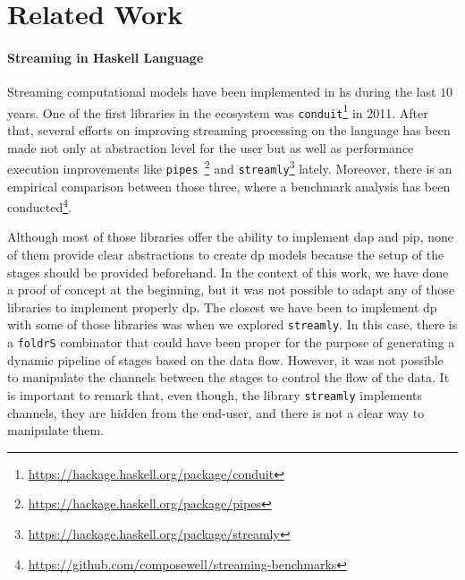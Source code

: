 \section{Related Work}\label{section:related-work}

\paragraph{Streaming in Haskell Language}
Streaming computational models have been implemented in \acrlong{hs} during the last $10$ years. One of the first libraries in the ecosystem was \texttt{conduit}\footnote{\url{https://hackage.haskell.org/package/conduit}} in 2011.
After that, several efforts on improving streaming processing on the language has been made not only at abstraction level for the user but as well as performance execution 
improvements like \texttt{pipes}~\footnote{\url{https://hackage.haskell.org/package/pipes}} and \texttt{streamly}\footnote{\url{https://hackage.haskell.org/package/streamly}} lately.
Moreover, there is an empirical comparison between those three, where a benchmark analysis has been conducted\footnote{\url{https://github.com/composewell/streaming-benchmarks}}.

Although most of those libraries offer the ability to implement \acrshort{dap} and \acrshort{pip}, none of them provide clear abstractions to create \acrshort{dp} models because
the setup of the stages should be provided beforehand. In the context of this work, we have done a proof of concept at the beginning, 
but it was not possible to adapt any of those libraries to implement properly \acrshort{dp}. 
The closest we have been to implement \acrshort{dp} with some of those libraries was when we explored \texttt{streamly}.
In this case, there is a \texttt{foldrS} combinator that could have been proper for the purpose of generating a dynamic pipeline of stages based on the data flow. However, it was not possible to manipulate the channels between the stages to control the flow of the data. It is important to remark that, even though, the  library  \texttt{streamly} implements channels, they are hidden from the end-user, and there is not a  clear way to manipulate them.


